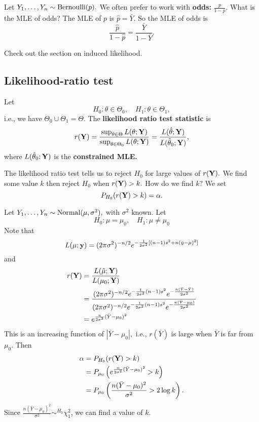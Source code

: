 \begin{eg}[Odds]
Let $Y_1,\ldots,Y_n\sim \operatorname*{Bernoulli}(p).$ We often prefer to work with \textbf{odds:} $\frac{p}{1-p}$. What is the MLE of odds? The MLE of $p$ is $\hat p=\bar Y.$ So the MLE of odds is
$$
\frac{\hat p}{1-\hat p}=\frac{\bar Y}{1-\bar Y}.
$$
\end{eg}

\begin{note}
		Check out the section on induced likelihood.
\end{note}

\subsection{Likelihood-ratio test}
\begin{definition}
Let 
$$
H_0:\theta \in \Theta_0, \quad H_1:\theta\in \Theta_1,
$$
i.e., we have $\Theta_0\cup \Theta_1=\Theta.$ The \textbf{likelihood ratio test statistic} is
$$
r(\mathbf Y)=\frac{\sup_{\theta\in\Theta}L(\theta;\mathbf Y)}{\sup_{\theta\in \Theta_0}L(\theta;\mathbf Y)}=\frac{L(\hat \theta;\mathbf Y)}{L(\hat \theta_0;\mathbf Y)},
$$
where $L(\hat \theta_0;\mathbf Y)$ is the \textbf{constrained MLE.}
\end{definition}
The likelihood ratio test tells us to reject $H_0$ for large values of $r(\mathbf Y).$ We find some value $k$ then reject $H_0$ when $r(\mathbf Y)>k.$ How do we find $k$? We set 
$$
P_{H_0}(r(\mathbf Y)>k)=\alpha.
$$
\begin{eg}
\label{eg:lrtnormal}
Let $Y_1,\ldots, Y_n\sim \operatorname*{Normal}(\mu,\sigma^2),$ with $\sigma^2$ known. Let
$$
H_0:\mu=\mu_0, \quad H_1:\mu\neq \mu_0
$$
Note that
$$
L(\mu;\mathbf y)=(2\pi\sigma^2)^{-n/2}e^{-\frac{1}{2\sigma^2}[(n-1)s^2+n(\bar y-\mu)^2]}
$$
and
\begin{align*}
    r(\mathbf Y)&=\frac{L(\hat \mu;\mathbf Y)}{L(\mu_0;\mathbf Y)}\\
    &=\frac{(2\pi\sigma^2)^{-n/2}e^{-\frac{1}{2\sigma^2}(n-1)s^2}e^{-\frac{n(\bar Y-\bar Y)}{2\sigma^2}}}{(2\pi\sigma^2)^{-n/2}e^{-\frac{1}{2\sigma^2}(n-1)s^2}e^{-\frac{n(\bar Y-\mu_0)}{2\sigma^2}}}\\
    &= e^{\frac{n}{2\sigma^2}(\bar Y-\mu_0)^2}
\end{align*}
This is an increasing function of $|\bar Y-\mu_0|,$ i.e., $r(\bar Y)$ is large when $\bar Y$ is far from $\mu_0.$ Then
\begin{align*}
    \alpha&=P_{H_0}(r(\mathbf Y)>k) \\
    &=P_{\mu_0}\left(e^{\frac{n}{2\sigma^2}(\bar Y-\mu_0)^2}>k\right) \\
    &=P_{\mu_0}\left({\frac{n(\bar Y-\mu_0)^2}{\sigma^2}}>2\log k\right).
\end{align*}
Since ${\frac{n(\bar Y-\mu_0)^2}{\sigma^2}}\sim^{H_0}\chi^2_1$, we can find a value of $k.$
\end{eg}
